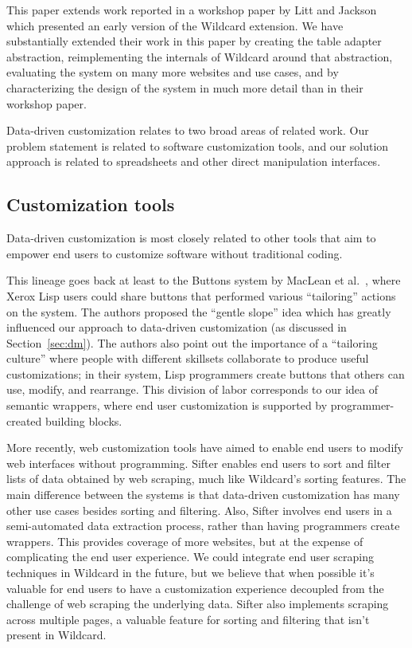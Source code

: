 \documentclass[sigplan,screen,10pt,anonymous,review]{acmart}
\begin{document}
This paper extends work reported in a workshop paper by Litt and Jackson
\citep{litt2020} which presented an early version of the Wildcard
extension. We have substantially extended their work in this paper by
creating the table adapter abstraction, reimplementing the internals of
Wildcard around that abstraction, evaluating the system on many more
websites and use cases, and by characterizing the design of the system
in much more detail than in their workshop paper.

Data-driven customization relates to two broad areas of related work.
Our problem statement is related to software customization tools, and
our solution approach is related to spreadsheets and other direct
manipulation interfaces.

\hypertarget{customization-tools}{%
\subsection{Customization tools}\label{customization-tools}}

Data-driven customization is most closely related to other tools that
aim to empower end users to customize software without traditional
coding.

This lineage goes back at least to the Buttons system by MacLean et
al.~\citep{maclean1990}, where Xerox Lisp users could share buttons that
performed various ``tailoring'' actions on the system. The authors
proposed the ``gentle slope'' idea which has greatly influenced our
approach to data-driven customization (as discussed in
Section~\ref{sec:dm}). The authors also point out the importance of a
``tailoring culture'' where people with different skillsets collaborate
to produce useful customizations; in their system, Lisp programmers
create buttons that others can use, modify, and rearrange. This division
of labor corresponds to our idea of semantic wrappers, where end user
customization is supported by programmer-created building blocks.

More recently, web customization tools have aimed to enable end users to
modify web interfaces without programming. Sifter \citep{huynh2006}
enables end users to sort and filter lists of data obtained by web
scraping, much like Wildcard's sorting features. The main difference
between the systems is that data-driven customization has many other use
cases besides sorting and filtering. Also, Sifter involves end users in
a semi-automated data extraction process, rather than having programmers
create wrappers. This provides coverage of more websites, but at the
expense of complicating the end user experience. We could integrate end
user scraping techniques in Wildcard in the future, but we believe that
when possible it's valuable for end users to have a customization
experience decoupled from the challenge of web scraping the underlying
data. Sifter also implements scraping across multiple pages, a valuable
feature for sorting and filtering that isn't present in Wildcard.
\end{document}
